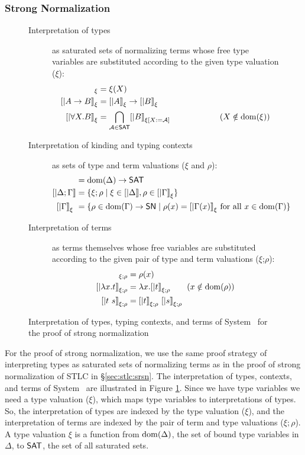 \subsubsection*{Strong Normalization}
\begin{figure}
\begin{singlespace}
\begin{description}
\item[Interpretation of types] as saturated sets of normalizing terms
	whose free type variables are substituted according to
	the given type valuation ($\xi$):
\begin{align*}
[| X |]_\xi           &= \xi(X) \\ 
[| A -> B |]_\xi      &= [|A|]_\xi -> [|B|]_\xi \\
[| \forall X.B |]_\xi &= \bigcap_{\mathcal{A}\in\SAT} [|B|]_{\xi[X:=\mathcal{A}]} \qquad\qquad\qquad (X\notin\dom(\xi))
\end{align*}
\item[Interpretation of kinding and typing contexts]
		       as sets of type and term valuations ($\xi$ and $\rho$):
\begin{align*}
[| \Delta        |] &= \dom(\Delta) -> \SAT \\
[| \Delta;\Gamma |] &= \{ \xi;\rho \mid \xi\in[|\Delta|], \rho\in[|\Gamma|]_\xi \} \\
[| \Gamma        |]_\xi\ &= \{ \rho \in \dom(\Gamma) -> \SN \mid \rho(x)=[|\Gamma(x)|]_\xi ~\text{for all}~x\in\dom(\Gamma) \}
\end{align*}
\item[Interpretation of terms] as terms themselves whose free variables are
	substituted according to the given pair of type and term valuations
	($\xi$;$\rho$):
\begin{align*}
[| x      |]_{\xi;\rho} &= \rho(x) \\
[| \l x.t |]_{\xi;\rho} &= \l x . [|t|]_{\xi;\rho} \qquad (x\notin\dom(\rho)) \\
[| t ~ s  |]_{\xi;\rho} &= [| t |]_{\xi;\rho} ~ [| s |]_{\xi;\rho}
\end{align*}
\end{description}
\caption[Interpretation of System \F\ for proving strong normalization]
	{Interpretation of types, typing contexts, and terms of System \F\
         for the proof of strong normalization}
\label{fig:interpF}
\end{singlespace}
\end{figure}
For the proof of strong normalization, we use the same proof strategy of
interpreting types as saturated sets of normalizing terms as in the proof of
strong normalization of STLC in \S\ref{sec:stlc:srsn}. The interpretation of
types, contexts, and terms of System \F\ are illustrated in
Figure \ref{fig:interpF}. Since we have type variables we need a type valuation
($\xi$), which maps type variables to interpretations of types. So, the
interpretation of types are indexed by the type valuation ($\xi$), and
the interpretation of terms are indexed by the pair of term and type valuations
($\xi;\rho$). A type valuation $\xi$ is a function from $\mathop{\mathrm{dom}}(\Delta)$,
the set of bound type variables in $\Delta$, to $\mathsf{SAT}$, the set of all
saturated sets.


